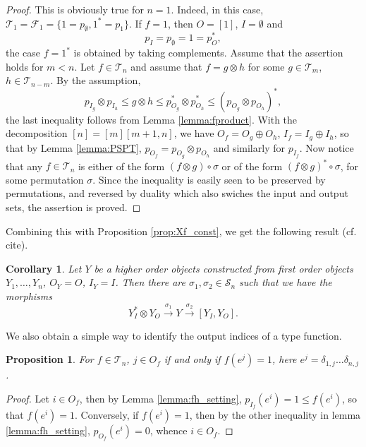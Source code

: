 \documentclass[12pt]{article}
\newtheorem{coro}{Corollary}
\newtheorem{prop}{Proposition}
\theoremstyle{definition}
\theoremstyle{remark}
\def\Te{\mathcal T}
\def\Fe{\mathcal F}
\def\permut{\mathscr{S}}
\begin{document}
\begin{proof} This is obviously true for $n=1$. Indeed, in this case,
$\Te_1=\Fe_1=\{1=p_\emptyset,1^*=p_{1}\}$. If $f=1$, then $O=[1]$, $I=\emptyset$ and 
\[
p_I=p_{\emptyset}=1=p_O^*,
\]
the case  $f=1^*$ is obtained by taking complements. Assume that the assertion holds for
$m<n$. Let $f\in \Te_n$ and assume that  $f=g\otimes h$ for some  $g\in
\Te_m$, $h\in \Te_{n-m}$.  By the assumption,
\[
p_{I_g}\otimes p_{I_h}\le g\otimes h\le p^*_{O_g}\otimes p^*_{O_h}\le (p_{O_g}\otimes
p_{O_h})^*,
\]
the last inequality follows from Lemma \ref{lemma:fproduct}. With the decomposition
$[n]=[m][m+1,n]$, we have   
$O_f=O_g\oplus O_h$, $I_f=I_g\oplus I_h$, so that by Lemma \ref{lemma:PSPT}, 
$p_{O_f}=p_{O_g}\otimes p_{O_h}$ and
similarly for $p_{I_f}$. Now notice that any $f\in \Te_n$ is either of the form $(f\otimes
g)\circ \sigma$ or of the form $(f\otimes g)^*\circ \sigma$, for some permutation
$\sigma$. Since the inequality is easily seen to be preserved by
permutations, and reversed by duality which also swiches the input and output sets, the
assertion is proved.

\end{proof}


Combining this with Proposition \ref{prop:Xf_const}, we get the following result
(cf. cite). 

\begin{coro}\label{coro:setting} Let $Y$ be a higher order objects constructed from
first order objects $Y_1,\dots, Y_n$,  $O_Y=O$,
$I_Y=I$.  Then there are
$\sigma_1,\sigma_2\in \permut_n$ such that we have the  morphisms 
\[
Y_I^*\otimes Y_O\xrightarrow{\sigma_1} Y
\xrightarrow{\sigma_2} [Y_I, Y_O].
\]
 


\end{coro}



We also obtain  a simple  way to identify the output indices  of a type
function.

\begin{prop}\label{prop:fh_outputs} For $f\in \Te_n$, $j\in O_f$ if and only if
$f(e^j)=1$, here $e^j=\delta_{1,j}\dots\delta_{n,j}$.


\end{prop}


\begin{proof} Let $i\in O_f$, then by Lemma \ref{lemma:fh_setting}, $p_{I_f}(e^i)=1\le
f(e^i)$, so that $f(e^i)=1$. Conversely, if $f(e^i)=1$, then by the other inequality in
lemma \ref{lemma:fh_setting}, $p_{O_f}(e^i)=0$, whence $i\in O_f$.


\end{proof}
\end{document}
